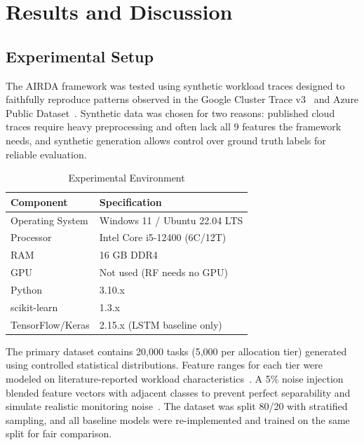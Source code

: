\documentclass[conference]{IEEEtran}
\begin{document}
\section{\textbf{Results and Discussion}}

\subsection{Experimental Setup}
The AIRDA framework was tested using synthetic workload traces designed to faithfully reproduce patterns observed in the Google Cluster Trace v3~\cite{Ref4}\cite{Ref8} and Azure Public Dataset~\cite{Ref8}. Synthetic data was chosen for two reasons: published cloud traces require heavy preprocessing and often lack all 9 features the framework needs, and synthetic generation allows control over ground truth labels for reliable evaluation.

\begin{table}[htbp]
\caption{Experimental Environment}
\begin{center}
\begin{tabular}{|p{3.5cm}|p{4.0cm}|}
\hline
\textbf{Component} & \textbf{Specification} \\
\hline
Operating System & Windows 11 / Ubuntu 22.04 LTS \\
\hline
Processor & Intel Core i5-12400 (6C/12T) \\
\hline
RAM & 16 GB DDR4 \\
\hline
GPU & Not used (RF needs no GPU)~\cite{Ref9} \\
\hline
Python & 3.10.x \\
\hline
scikit-learn & 1.3.x \\
\hline
TensorFlow/Keras & 2.15.x (LSTM baseline only) \\
\hline
\end{tabular}
\label{tab:environment}
\end{center}
\end{table}

The primary dataset contains 20,000 tasks (5,000 per allocation tier) generated using controlled statistical distributions. Feature ranges for each tier were modeled on literature-reported workload characteristics~\cite{Ref1}\cite{Ref4}\cite{Ref8}. A 5\% noise injection blended feature vectors with adjacent classes to prevent perfect separability and simulate realistic monitoring noise~\cite{Ref2}. The dataset was split 80/20 with stratified sampling, and all baseline models were re-implemented and trained on the same split for fair comparison.
\end{document}
